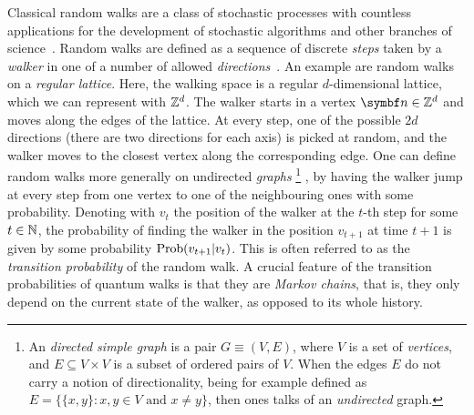 Classical random walks are a class of stochastic processes with countless applications for the development of stochastic algorithms and other branches of science~\cite{berg1993random,fama1995random,motwani1995randomized,hughes1996random,schoning1999probabilistic,codling2008random}.
Random walks are defined as a sequence of discrete \textit{steps} taken by a \textit{walker} in one of a number of allowed \emph{directions}~\cite{lovasz1993random}.
An example are random walks on a \textit{regular lattice}. Here, the walking space is a regular $d$-dimensional lattice, which we can represent with ${\mathbb{Z}}^d$. The walker starts in a vertex $\bs n\in\ZZ^d$ and moves along the edges of the lattice.
At every step, one of the possible $2d$ directions (there are two directions for each axis) is picked at random, and the walker moves to the closest vertex along the corresponding edge.
One can define random walks more generally on undirected \textit{graphs}
\footnote{An \textit{directed simple graph} is a pair $G\equiv (V,E)$, where $V$ is a set of \textit{vertices}, and $E\subseteq V\times V$ is a subset of ordered pairs of $V$. When the edges $E$ do not carry a notion of directionality, being for example defined as $E=\{\{x,y\} : x,y\in V\text{ and }x\neq y\}$, then ones talks of an \textit{undirected} graph.}
, by having the walker jump at every step from one vertex to one of the neighbouring ones with some probability.
Denoting with $v_t$ the position of the walker at the $t$-th step for some $t\in{\mathbb{N}}$, the probability of finding the walker in the position $v_{t+1}$ at time $t+1$ is given by some probability $\operatorname*{Prob}(v_{t+1}|v_{t})$. This is often referred to as the \emph{transition probability} of the random walk. 
A crucial feature of the transition probabilities of quantum walks is that they are \emph{Markov chains}, that is, they only depend on the current state of the walker, as opposed to its whole history. 

